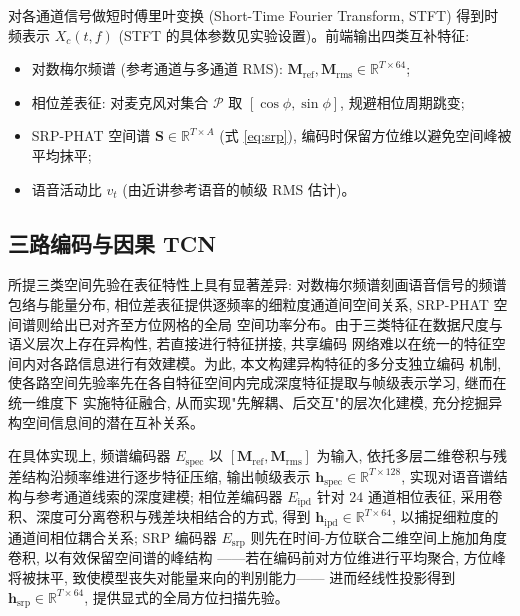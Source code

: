 \documentclass[UTF8,a4paper,11pt]{ctexart}
\begin{document}
对各通道信号做短时傅里叶变换 (Short-Time Fourier Transform, STFT) 得到时频表示 $X_c(t,f)$
(STFT 的具体参数见实验设置)。前端输出四类互补特征:
\begin{itemize}
  \item 对数梅尔频谱 (参考通道与多通道 RMS): $\mathbf{M}_\mathrm{ref},\mathbf{M}_\mathrm{rms}\in\mathbb{R}^{T\times 64}$;
  \item 相位差表征: 对麦克风对集合 $\mathcal{P}$ 取 $[\cos\phi,\sin\phi]$, 规避相位周期跳变;
  \item SRP-PHAT 空间谱 $\mathbf{S}\in\mathbb{R}^{T\times A}$ (式 \ref{eq:srp}), 编码时保留方位维以避免空间峰被平均抹平;
  \item 语音活动比 $v_t$ (由近讲参考语音的帧级 RMS 估计)。
\end{itemize}

\subsection{三路编码与因果 TCN}

所提三类空间先验在表征特性上具有显著差异: 对数梅尔频谱刻画语音信号的频谱包络与能量分布,
相位差表征提供逐频率的细粒度通道间空间关系, SRP-PHAT 空间谱则给出已对齐至方位网格的全局
空间功率分布。由于三类特征在数据尺度与语义层次上存在异构性, 若直接进行特征拼接, 共享编码
网络难以在统一的特征空间内对各路信息进行有效建模。为此, 本文构建异构特征的多分支独立编码
机制, 使各路空间先验率先在各自特征空间内完成深度特征提取与帧级表示学习, 继而在统一维度下
实施特征融合, 从而实现"先解耦、后交互"的层次化建模, 充分挖掘异构空间信息间的潜在互补关系。

在具体实现上, 频谱编码器 $E_\mathrm{spec}$ 以 $[\mathbf{M}_\mathrm{ref},\mathbf{M}_\mathrm{rms}]$
为输入, 依托多层二维卷积与残差结构沿频率维进行逐步特征压缩, 输出帧级表示
$\mathbf{h}_\mathrm{spec}\in\mathbb{R}^{T\times 128}$, 实现对语音谱结构与参考通道线索的深度建模;
相位差编码器 $E_\mathrm{ipd}$ 针对 $24$ 通道相位表征, 采用卷积、深度可分离卷积与残差块相结合的方式,
得到 $\mathbf{h}_\mathrm{ipd}\in\mathbb{R}^{T\times 64}$, 以捕捉细粒度的通道间相位耦合关系;
SRP 编码器 $E_\mathrm{srp}$ 则先在时间-方位联合二维空间上施加角度卷积, 以有效保留空间谱的峰结构
——若在编码前对方位维进行平均聚合, 方位峰将被抹平, 致使模型丧失对能量来向的判别能力——
进而经线性投影得到 $\mathbf{h}_\mathrm{srp}\in\mathbb{R}^{T\times 64}$, 提供显式的全局方位扫描先验。
\end{document}
